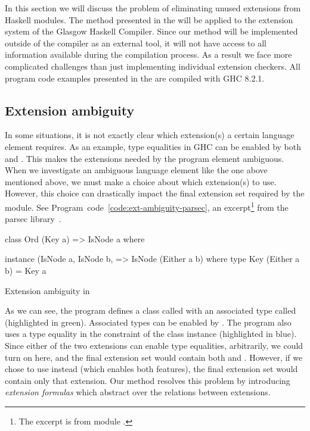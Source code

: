 \documentclass[main.tex]{subfiles}
\begin{document}
	
	In this section we will discuss the problem of eliminating unused extensions from Haskell modules. The method presented in the \paper{} will be applied to the extension system of the Glasgow Haskell Compiler. Since our method will be implemented outside of the compiler as an external tool, it will not have access to all information available during the compilation process. As a result we face more complicated challenges than just implementing individual extension checkers. All program code examples presented in the \paper{} are compiled with GHC 8.2.1.
	
	\subsection{Extension ambiguity}
	
	In some situations, it is not exactly clear which extension(s) a certain language element requires. As an example, type equalities in GHC can be enabled by both  and . This makes the extensions needed by the program element ambiguous. When we investigate an ambiguous language element like the one above mentioned above, we must make a choice about which extension(s) to use. However, this choice can drastically impact the final extension set required by the module. See Program~code~\ref{code:ext-ambiguity-parsec}, an excerpt\footnote{The excerpt is from module .} from the parsec library~\cite{parsec}.
	
	\begin{codeFloat}
		\begin{haskell}
			class Ord (Key a) => IsNode a 
			  where %
			
			instance (IsNode a, IsNode b, %
			          => IsNode (Either a b) where
			type Key (Either a b) = Key a
		\end{haskell}
		\caption{Extension ambiguity in }
		\label{code:ext-ambiguity-parsec}
	\end{codeFloat}
	
	As we can see, the program defines a class called  with an associated type called  (highlighted in green). Associated types can be enabled by . The program	also uses a type equality in the constraint of the  class instance (highlighted in blue). Since either of the two extensions can enable type equalities, arbitrarily, we could turn on  here, and the final extension set would contain both  and . However, if we chose to use  instead (which enables both features), the final extension set would contain only that extension. Our method resolves this problem by introducing \emph{extension formulas} which abstract over the relations between extensions.
	
\end{document}
